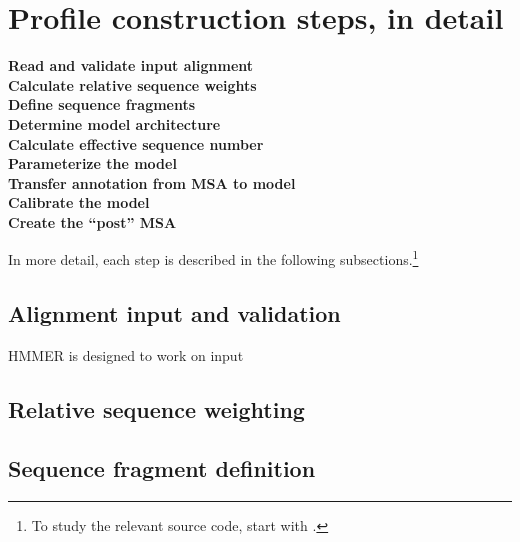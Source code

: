 \section{Profile construction steps, in detail}
\label{section:pipeline}
\setcounter{footnote}{0}

\begin{description}

\item [\textbf{Read and validate input alignment}]

\item [\textbf{Calculate relative sequence weights}]

\item [\textbf{Define sequence fragments}]

\item [\textbf{Determine model architecture}]

\item [\textbf{Calculate effective sequence number}]

\item [\textbf{Parameterize the model}]

\item [\textbf{Transfer annotation from MSA to model}]

\item [\textbf{Calibrate the model}]

\item [\textbf{Create the ``post'' MSA}]

\end{description}

In more detail, each step is described in the following
subsections.\footnote{To study the relevant source code, start with
  .}


\subsection{Alignment input and validation}

HMMER is designed to work on input 


\subsection{Relative sequence weighting}

\subsection{Sequence fragment definition}

